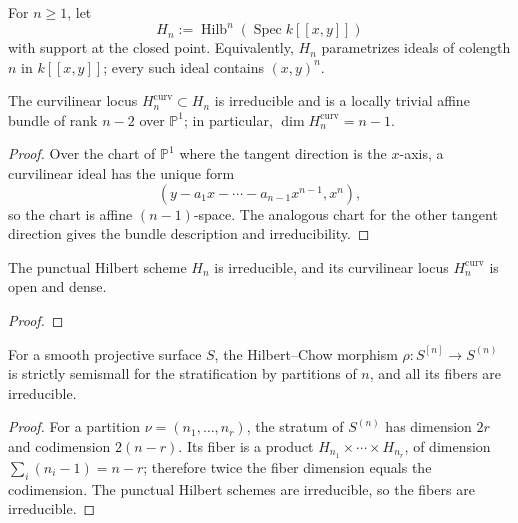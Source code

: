 \begin{definition}\label{fga-def-7-4-3}\uses{}
For $n\ge1$, let
\[
H_n:=\operatorname{Hilb}^{n}\!\left(\operatorname{Spec}k[[x,y]]\right)
\]
with support at the closed point.  Equivalently, $H_n$ parametrizes ideals of
colength $n$ in $k[[x,y]]$; every such ideal contains $(x,y)^n$.
\end{definition}

\begin{remark}\label{fga-rem-7-4-5}
The curvilinear locus $H_n^{\mathrm{curv}}\subset H_n$ is irreducible and is a
locally trivial affine bundle of rank $n-2$ over $\mathbb P^1$; in particular,
$\dim H_n^{\mathrm{curv}}=n-1$.
\end{remark}
\begin{proof}
Over the chart of $\mathbb P^1$ where the tangent direction is the $x$-axis, a
curvilinear ideal has the unique form
\[
(y-a_1x-\cdots-a_{n-1}x^{n-1},x^n),
\]
so the chart is affine $(n-1)$-space.  The analogous chart for the other tangent
direction gives the bundle description and irreducibility.
\end{proof}

\begin{theorem}\label{fga-the-7-4-6}
The punctual Hilbert scheme $H_n$ is irreducible, and its curvilinear locus
$H_n^{\mathrm{curv}}$ is open and dense.
\end{theorem}
\begin{proof}
\notready
\end{proof}

\begin{proposition}\label{fga-pro-7-5-2}
For a smooth projective surface $S$, the Hilbert--Chow morphism
$\rho:S^{[n]}\to S^{(n)}$ is strictly semismall for the stratification by
partitions of $n$, and all its fibers are irreducible.
\end{proposition}
\begin{proof}
For a partition $\nu=(n_1,\ldots,n_r)$, the stratum of $S^{(n)}$ has dimension
$2r$ and codimension $2(n-r)$.  Its fiber is a product
$H_{n_1}\times\cdots\times H_{n_r}$, of dimension $\sum_i(n_i-1)=n-r$;
therefore twice the fiber dimension equals the codimension.  The punctual
Hilbert schemes are irreducible, so the fibers are irreducible.
\end{proof}

